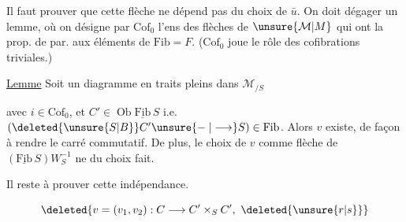 Il faut prouver que cette flèche ne dépend pas du choix de $\bar u$. On doit dégager un lemme, où on désigne par  $\mathrm{Cof}_0$ l'ens des flèches de $\unsure{\mathcal M|M}$ qui ont la prop. de  par. aux éléments de $\mathrm{Fib}=F$. ($\mathrm{Cof}_0$ joue le rôle des cofibrations triviales.)

\uline{Lemme} Soit un diagramme en traits pleins dans $\mathcal M_{/S}$


avec $i\in\mathrm{Cof}_0$, et $C'\in\operatorname{Ob}\underline{\mathrm{Fib}}\,S$ i.e. $(\deleted{\unsure{S|B}}C'\unsure{\relbar|\longrightarrow} S)\in\mathrm{Fib}$. Alors $v$ existe, de façon à rendre le carré commutatif. De plus,  le choix de $v$  comme  flèche de $(\underline{\mathrm{Fib}}\, S) W_S^{-1}$ ne   du choix fait.

Il reste à prouver cette indépendance.


\[
\deleted{v=(v_1,v_2):C\longrightarrow C'\times_S C',\ \deleted{\unsure{r|s}}}
\]


